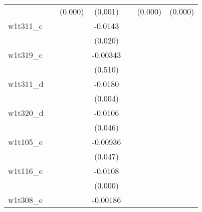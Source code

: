 {\begin{tabular}{l*{6}{c}}
            &                     &     (0.000)         &     (0.001)         &                     &     (0.000)         &     (0.000)         \\
[1em]
w1t311\_c    &                     &                     &     -0.0143\sym{**} &                     &                     &                     \\
            &                     &                     &     (0.020)         &                     &                     &                     \\
[1em]
w1t319\_c    &                     &                     &    -0.00343         &                     &                     &                     \\
            &                     &                     &     (0.510)         &                     &                     &                     \\
[1em]
w1t311\_d    &                     &                     &     -0.0180\sym{***}&                     &                     &                     \\
            &                     &                     &     (0.004)         &                     &                     &                     \\
[1em]
w1t320\_d    &                     &                     &     -0.0106\sym{**} &                     &                     &                     \\
            &                     &                     &     (0.046)         &                     &                     &                     \\
[1em]
w1t105\_e    &                     &                     &    -0.00936\sym{**} &                     &                     &                     \\
            &                     &                     &     (0.047)         &                     &                     &                     \\
[1em]
w1t116\_e    &                     &                     &     -0.0108\sym{***}&                     &                     &                     \\
            &                     &                     &     (0.000)         &                     &                     &                     \\
[1em]
w1t308\_e    &                     &                     &    -0.00186         &                     &                     &                     \\

\end{tabular}}
